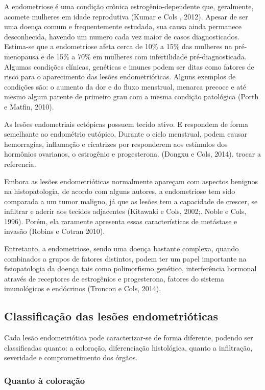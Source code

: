 \documentclass[12pt]{article} %
\begin{document}
A endometriose é uma condição crônica estrogênio-dependente que,
geralmente, acomete mulheres em idade reprodutiva (Kumar e Cols ,
2012). Apesar de ser uma doença comum e frequentemente estudada, sua
causa ainda permanece desconhecida, havendo um numero cada vez maior
de casos diagnosticados. Estima-se que a endometriose afeta cerca de 10\% a
15\% das mulheres na pré-menopausa e de 15\% a 70\% em mulheres com
infertilidade pré-diagnosticada. Algumas condições clínicas, genéticas
e imunes podem ser ditas como fatores de risco para o aparecimento das
lesões endometrióticas. Alguns exemplos de condições são: o aumento da
dor e do fluxo menstrual, menarca precoce e até mesmo algum parente de
primeiro grau com a mesma condição patológica (Porth e Matfin, 2010).

As lesões endometriais ectópicas possuem tecido ativo. E respondem de
forma semelhante ao endométrio eutópico. Durante o ciclo menstrual,
podem causar hemorragias, inflamação e cicatrizes por responderem aos
estímulos dos hormônios ovarianos, o estrogênio e
progesterona. (Dongxu e Cols, 2014). trocar a referencia.

Embora as lesões endometrióticas normalmente apareçam com aspectos
benignos na histopatologia, de acordo com alguns autores, a
endometriose tem sido comparada a um tumor maligno, já que as lesões
tem a capacidade de crescer, se infiltrar e aderir aos tecidos
adjacentes (Kitawaki e Cols, 2002;. Noble e Cols, 1996). Porém, ela
raramente apresenta essas características de metástase e invasão
(Robins e Cotran 2010). 

Entretanto, a endometriose, sendo uma doença bastante complexa, 
quando combinados a grupos de fatores distintos, podem ter um papel
importante na fisiopatologia da doença tais como polimorfismo 
genético, interferência hormonal através de receptores de estrogênios
e progesterona, fatores do sistema imunológicos e endócrinos (Troncon
e Cols, 2014).

\subsection{Classificação das lesões endometrióticas}
Cada lesão endometriótica pode caracterizar-se de forma diferente, podendo ser classificadas
quanto: a coloração, diferenciação histológica, quanto a infiltração, severidade e comprometimento dos órgãos.


\subsubsection{Quanto à coloração} 
\end{document}
